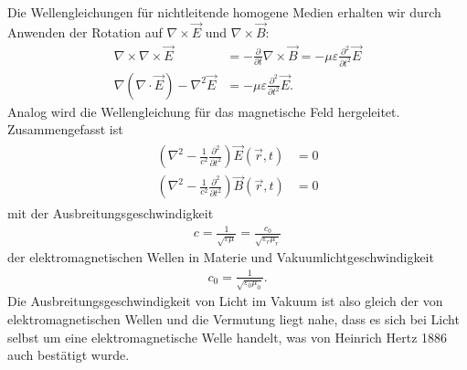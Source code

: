 Die Wellengleichungen für nichtleitende homogene Medien erhalten wir durch Anwenden der Rotation auf $\nabla\times \vec E$ und $\nabla\times\vec B$:
\begin{align*}
    \nabla\times\nabla\times\vec E            & = -\frac{\partial}{\partial t}\nabla\times \vec B =-\mu\varepsilon \frac{\partial^2}{\partial t^2}\vec E \\
    \nabla(\nabla\cdot \vec E)-\nabla^2\vec E & = -\mu\varepsilon \frac{\partial^2}{\partial t^2}\vec E.
\end{align*}
Analog wird die Wellengleichung für das magnetische Feld hergeleitet. Zusammengefasst ist
\begin{align}
    \label{eq:wellengleichungen}
    \boxed{\begin{aligned}
                   \left(\nabla^2-\frac{1}{c^2}\frac{\partial^2}{\partial t^2}\right) \vec E(\vec r,t) & =0 \\
                   \left(\nabla^2-\frac{1}{c^2}\frac{\partial^2}{\partial t^2}\right) \vec B(\vec r,t) & =0
               \end{aligned}}
\end{align}
mit der Ausbreitungsgeschwindigkeit
\begin{align*}
    c=\frac{1}{\sqrt{\varepsilon\mu}} = \frac{c_0}{\sqrt{\varepsilon_r\mu_r}}
\end{align*}
der elektromagnetischen Wellen in Materie und Vakuumlichtgeschwindigkeit
\begin{align*}
    c_0 = \frac{1}{\sqrt{\varepsilon_0\mu_0}}.
\end{align*}
Die Ausbreitungsgeschwindigkeit von Licht im Vakuum ist also gleich der von elektromagnetischen Wellen und die Vermutung liegt nahe,
dass es sich bei Licht selbst um eine elektromagnetische Welle handelt, was von Heinrich Hertz 1886 auch bestätigt wurde.

